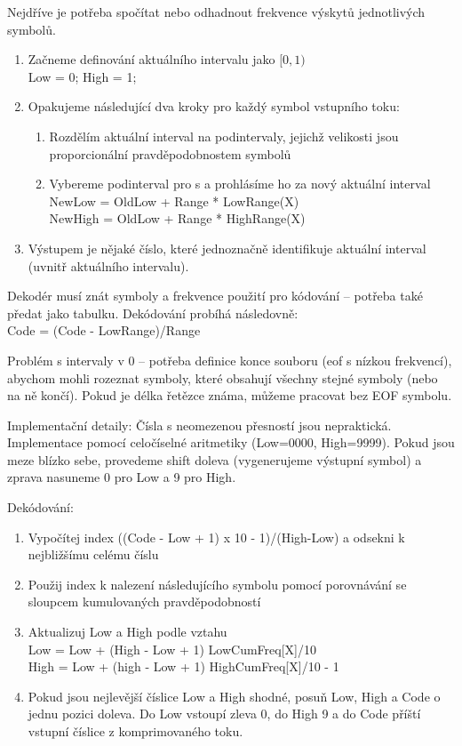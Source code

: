 \documentclass[a4paper, 11pt]{report}
\begin{document}
Nejdříve je potřeba spočítat nebo odhadnout frekvence výskytů jednotlivých symbolů.
\begin{enumerate}
	\item Začneme definování aktuálního intervalu jako $[0, 1)$\\
	Low = 0; High = 1;
	\item Opakujeme následující dva kroky pro každý symbol vstupního toku:
	\begin{enumerate}
		\item Rozdělím aktuální interval na podintervaly, jejichž velikosti jsou proporcionální pravděpodobnostem symbolů
		\item Vybereme podinterval pro s a prohlásíme ho za nový aktuální interval\\
		NewLow = OldLow + Range * LowRange(X)\\
		NewHigh = OldLow + Range * HighRange(X)
	\end{enumerate}
	\item Výstupem je nějaké číslo, které jednoznačně identifikuje aktuální interval (uvnitř aktuálního intervalu).
\end{enumerate}
Dekodér musí znát symboly a frekvence použití pro kódování -- potřeba také předat jako tabulku. Dekódování probíhá následovně:\\
Code = (Code - LowRange)/Range

Problém s intervaly v 0 -- potřeba definice konce souboru (eof s nízkou frekvencí), abychom mohli rozeznat symboly, které obsahují všechny stejné symboly (nebo na ně končí). Pokud je délka řetězce známa, můžeme pracovat bez EOF symbolu.

Implementační detaily: Čísla s neomezenou přesností jsou nepraktická. Implementace pomocí celočíselné aritmetiky (Low=0000, High=9999). Pokud jsou meze blízko sebe, provedeme shift doleva (vygenerujeme výstupní symbol) a zprava nasuneme 0 pro Low a 9 pro High.

Dekódování:
\begin{enumerate}
	\item Vypočítej index ((Code - Low + 1) x 10 - 1)/(High-Low) a odsekni k nejbližšímu celému číslu
	\item Použij index k nalezení následujícího symbolu pomocí porovnávání se sloupcem kumulovaných pravděpodobností
	\item Aktualizuj Low a High podle vztahu\\
	Low = Low + (High - Low + 1) LowCumFreq[X]/10\\
	High = Low + (high - Low + 1) HighCumFreq[X]/10 - 1
	\item Pokud jsou nejlevější číslice Low a High shodné, posuň Low, High a Code o jednu pozici doleva. Do Low vstoupí zleva 0, do High 9 a do Code příští vstupní číslice z komprimovaného toku.
\end{enumerate}
\end{document}

